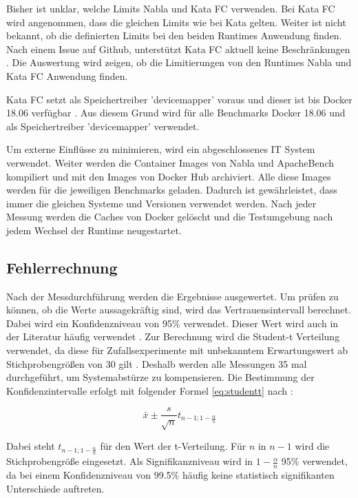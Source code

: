 Bisher ist unklar, welche Limits Nabla und Kata FC verwenden. Bei Kata FC wird angenommen, dass die gleichen Limits wie bei Kata gelten. Weiter ist nicht bekannt, ob die definierten Limits bei den beiden Runtimes Anwendung finden. Nach einem Issue auf Github, unterstützt Kata FC aktuell keine Beschränkungen \cite[vgl.][]{katacontainers.20190123}. Die Auswertung wird zeigen, ob die Limitierungen von den Runtimes Nabla und Kata FC Anwendung finden.

Kata FC setzt als Speichertreiber 'devicemapper' voraus und dieser ist bis Docker 18.06 verfügbar \cite[vgl.][]{katacontainers.20190514}. Aus diesem Grund wird für alle Benchmarks Docker 18.06 und als Speichertreiber 'devicemapper' verwendet.

Um externe Einflüsse zu minimieren, wird ein abgeschlossenes IT System verwendet. Weiter werden die Container Images von Nabla und ApacheBench kompiliert und mit den Images von Docker Hub archiviert. Alle diese Images werden für die jeweiligen Benchmarks geladen. Dadurch ist gewährleistet, dass immer die gleichen Systeme und Versionen verwendet werden. Nach jeder Messung werden die Caches von Docker gelöscht und die Testumgebung nach jedem Wechsel der Runtime neugestartet.

\subsection{Fehlerrechnung}
Nach der Messdurchführung werden die Ergebnisse ausgewertet. Um prüfen zu können, ob die Werte aussagekräftig sind, wird das Vertrauensintervall berechnet. Dabei wird ein Konfidenzniveau von 95\% verwendet. Dieser Wert wird auch in der Literatur häufig verwendet \cite[vgl.][212]{Jain.1991}.
Zur Berechnung wird die Student-t Verteilung verwendet, da diese für Zufallsexperimente mit unbekanntem Erwartungswert ab Stichprobengrößen von 30 gilt \cite[vgl.][26]{Prof.Dr.Ing.L.Grundig.2003}. Deshalb werden alle Messungen 35 mal durchgeführt, um Systemabstürze zu kompensieren.
Die Bestimmung der Konfidenzintervalle erfolgt mit folgender Formel \ref{eq:studentt} nach \cite[][]{Lohninger.2007}:

\begin{equation}
\bar{x}\pm\frac{s}{\sqrt{n}} t_{n-1;1-\frac{\alpha}{n}}
\label{eq:studentt}
\end{equation}

Dabei steht $t_{n-1;1-\frac{\alpha}{n}}$ für den Wert der t-Verteilung. Für $n$ in $n-1$ wird die Stichprobengröße eingesetzt. Als Signifikanzniveau wird in $1-\frac{\alpha}{n}$ 95\%  verwendet, da bei einem Konfidenzniveau von 99.5\% häufig keine statistisch signifikanten Unterschiede auftreten.

